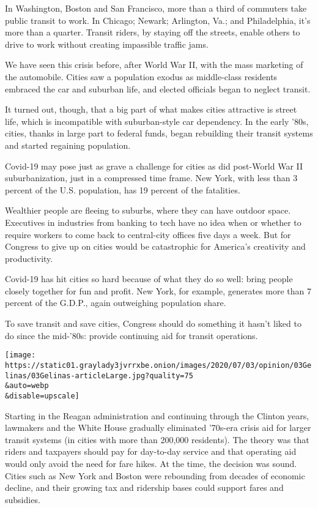 In Washington, Boston and San Francisco, more than a third of commuters
take public transit to work. In Chicago; Newark; Arlington, Va.; and
Philadelphia, it's more than a quarter. Transit riders, by staying off
the streets, enable others to drive to work without creating impassible
traffic jams.

We have seen this crisis before, after World War II, with the mass
marketing of the automobile. Cities saw a population exodus as
middle-class residents embraced the car and suburban life, and elected
officials began to neglect transit.

It turned out, though, that a big part of what makes cities attractive
is street life, which is incompatible with suburban-style car
dependency. In the early '80s, cities, thanks in large part to federal
funds, began rebuilding their transit systems and started regaining
population.

Covid-19 may pose just as grave a challenge for cities as did post-World
War II suburbanization, just in a compressed time frame. New York, with
less than 3 percent of the U.S. population, has 19 percent of the
fatalities.

Wealthier people are fleeing to suburbs, where they can have outdoor
space. Executives in industries from banking to tech have no idea when
or whether to require workers to come back to central-city offices five
days a week. But for Congress to give up on cities would be catastrophic
for America's creativity and productivity.

Covid-19 has hit cities so hard because of what they do so well: bring
people closely together for fun and profit. New York, for example,
generates more than 7 percent of the G.D.P., again outweighing
population share.

To save transit and save cities, Congress should do something it hasn't
liked to do since the mid-'80s: provide continuing aid for transit
operations.

\texttt{[image: https://static01.graylady3jvrrxbe.onion/images/2020/07/03/opinion/03Gelinas/03Gelinas-articleLarge.jpg?quality=75\\\&auto=webp\\\&disable=upscale]}

Starting in the Reagan administration and continuing through the Clinton
years, lawmakers and the White House gradually eliminated '70s-era
crisis aid for larger transit systems (in cities with more than 200,000
residents). The theory was that riders and taxpayers should pay for
day-to-day service and that operating aid would only avoid the need for
fare hikes. At the time, the decision was sound. Cities such as New York
and Boston were rebounding from decades of economic decline, and their
growing tax and ridership bases could support fares and subsidies.

